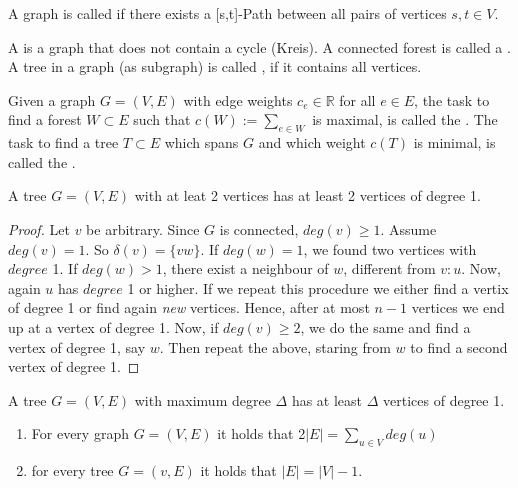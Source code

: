 \begin{lec}[2011-10-13]\end{lec}
\setcounter{lecture}{2}
\setcounter{section}{2}


\begin{defn}[connected]
A graph is called  if there exists a [s,t]-Path between all pairs of vertices $s,t \in V$.
\end{defn}

\begin{defn}
A  is a graph that does not contain a cycle (Kreis). A connected forest is called a
. A tree in a graph (as subgraph) is called
, if it contains all vertices.

Given a graph $G=(V,E)$ with edge weights $c_e \in \mathbb{R}$ for all $e \in E$, the task to find a forest $W \subset E$ such that $c(W):=\sum\limits_{e\in W} $ is maximal, is called the
. 
The task to find a tree $T\subset E$ which spans $G$ and which weight $c(T)$ is minimal, is called the
.
\end{defn}

\begin{lem}
A tree $G=(V,E)$ with at leat 2 vertices has at least 2 vertices of degree 1.
\end{lem}
\begin{proof}
Let $v$ be arbitrary. Since $G$ is connected, $deg(v) \geq 1$. Assume $deg(v)=1$. So $\delta(v)=\{vw\}$. If $deg(w)=1$, we found two vertices with $degree$ 1. If $deg(w)>1$, there exist a neighbour of $w$, different from $v:u$. Now, again $u$ has $degree$ 1 or higher. If we repeat this procedure we either find a vertix of degree 1 or find again \emph{new} vertices. Hence, after at most $n-1$ vertices we end up at a vertex of degree 1. 
Now, if $deg(v) \geq 2$, we do the same and find a vertex of degree 1, say $w$. Then repeat the above, staring from $w$ to find a second vertex of degree 1.
\end{proof}

\begin{cor}
A tree $G=(V,E)$ with maximum degree $\Delta$ has at least $\Delta$ vertices of degree 1.
\end{cor}

\begin{lem}
	\begin{enumerate}
	\item For every graph $G=(V,E)$ it holds that 2$|E|=\sum\limits_{u \in V} deg(u)$
	\item for every tree $G=(v,E)$ it holds that $|E|=|V|-1$.
	\end{enumerate}
	\end{lem}


